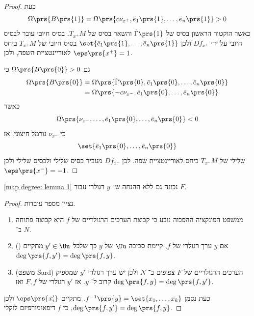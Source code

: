 \documentclass[a4paper,10pt,twoside,openany]{book}
\begin{document}
\begin{proof}

כעת
\[\Omega\prs{B\prs{1}} = \Omega\prs{c \nu_{x^+}, \bar{e}_1\prs{1}, \ldots, \bar{e}_n\prs{1}} > 0\]
כאשר
הוקטור הראשון בסיס של
$\dot{\Gamma}\prs{1}$
והשאר בסיס של
$T_{x^+}M$.
בסיס חיובי עובר לבסיס חיובי על ידי
$Df_{x^+}$
ולכן
$\set{\bar{e}_1\prs{1}, \ldots, \bar{e}_n\prs{1}}$
בסיס חיובי של
$T_{x^+}M$
ביחס לאוריינטציית השפה, ולכן
$\eps\prs{x^+} = 1$.

גם
$\Omega\prs{B\prs{0}} > 0$
כי 
\begin{align*}
\Omega\prs{B\prs{0}} &= \Omega\prs{\dot{\Gamma}\prs{0},\bar{e}_1\prs{0},\ldots, \bar{e}_n\prs{0}} \\
&= \Omega\prs{-c \nu_{x^-}, \bar{e}_1\prs{0},\ldots,\bar{e}_n\prs{0}}
\end{align*}
כאשר
\[\Omega\prs{\nu_{x^-}, \ldots, \bar{e}_1\prs{0},\ldots,\bar{e}_n\prs{0}} < 0\]
כי
$\nu_{x^-}$
נורמל חיצוני.
אז
\[\set{\bar{e}_1\prs{0} , \ldots, \bar{e}_n\prs{0}}\]
שלילי של
$T_{x^{-}} M$
ביחס לאוריינטציית שפה.
לכן
$Df_{x^{-}}$
מעביר בסיס שלילי ולבסיס שלילי ולכן
$\eps\prs{x^{-}} = -1$.
\end{proof}
\begin{lemma}\label{map degree: lemma 2}
\ref{map degree: lemma 1}
נכונה גם ללא ההנחה ש־%
$y$
רגולרי עבור
$F$.
\end{lemma}
\begin{proof}
נציין מספר עובדות.
\begin{enumerate}
\item ממשפט הפונקציה ההפכוה נובע כי קבוצת הערכים הרגולריים של
$f$
היא קבוצה פתוחה ב־%
$N$.
\item
()
אם
$y$
ערך רגולרי של
$f$,
קיימת סביבה
$\Uu$
של
$y$
כך שלכל
$y' \in \Uu$
מתקיים
$\deg\prs{f,y'} = \deg\prs{f,y}$.
\item
(משפט
\textenglish{Sard})
הערכים הרגולריים של
$F$
צפופים ב־%
$N$
ולכן יש ערך רגולרי
$y'$
שמספיק קרוב ל־%
$y$.
אז
$y'$
רגולרי של
$F,f$
ואז
$\deg\prs{f,y} = \deg\prs{f,y'}$.
\end{enumerate}

כעת נסמן
$f^{-1}\prs{y} = \set{x_1, \ldots, x_k}$.
מתקיים
$\eps\prs{x_i'}$
ולכן
$\deg\prs{f, y'} = \deg\prs{f,y}$,
כי
$f$
דיפאומורפיזם לוקלי.
\end{proof}
\end{document}
